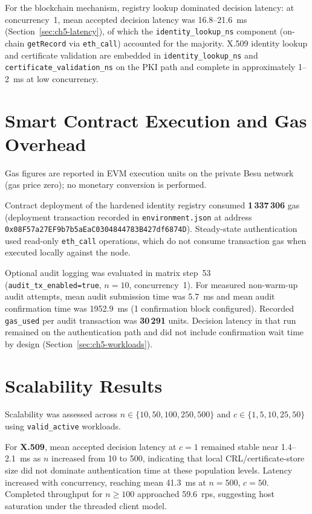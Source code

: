 For the blockchain mechanism, registry lookup dominated decision latency: at concurrency~1, mean accepted decision latency was 16.8--21.6~ms (Section~\ref{sec:ch5-latency}), of which the \texttt{identity\_lookup\_ns} component (on-chain \texttt{getRecord} via \texttt{eth\_call}) accounted for the majority. X.509 identity lookup and certificate validation are embedded in \texttt{identity\_lookup\_ns} and \texttt{certificate\_validation\_ns} on the PKI path and complete in approximately 1--2~ms at low concurrency.

\section{Smart Contract Execution and Gas Overhead}
\label{sec:ch5-gas}

Gas figures are reported in EVM execution units on the private Besu network (gas price zero); no monetary conversion is performed.

Contract deployment of the hardened identity registry consumed \textbf{1\,337\,306} gas (deployment transaction recorded in \texttt{environment.json} at address \texttt{0x08F57a27EF9b7b5aEaC0304844783B427df6874D}). Steady-state authentication used read-only \texttt{eth\_call} operations, which do not consume transaction gas when executed locally against the node.

Optional audit logging was evaluated in matrix step~53 (\texttt{audit\_tx\_enabled=true}, $n=10$, concurrency~1). For measured non-warm-up audit attempts, mean audit submission time was 5.7~ms and mean audit confirmation time was 1952.9~ms (1 confirmation block configured). Recorded \texttt{gas\_used} per audit transaction was \textbf{30\,291} units. Decision latency in that run remained on the authentication path and did not include confirmation wait time by design (Section~\ref{sec:ch5-workloads}).

\section{Scalability Results}
\label{sec:ch5-scalability}

Scalability was assessed across $n \in \{10,50,100,250,500\}$ and $c \in \{1,5,10,25,50\}$ using \texttt{valid\_active} workloads.

For \textbf{X.509}, mean accepted decision latency at $c=1$ remained stable near 1.4--2.1~ms as $n$ increased from 10 to 500, indicating that local CRL/certificate-store size did not dominate authentication time at these population levels. Latency increased with concurrency, reaching mean 41.3~ms at $n=500$, $c=50$. Completed throughput for $n \geq 100$ approached 59.6~rps, suggesting host saturation under the threaded client model.

